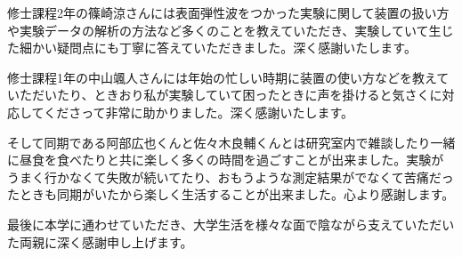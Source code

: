 \documentclass[dvipdfmx,11pt]{jsreport}
\numberwithin{equation}{chapter}
\numberwithin{table}{chapter}
\begin{document}
修士課程2年の篠崎涼さんには表面弾性波をつかった実験に関して装置の扱い方や実験データの解析の方法など多くのことを教えていただき、実験していて生じた細かい疑問点にも丁寧に答えていただきました。深く感謝いたします。

修士課程1年の中山颯人さんには年始の忙しい時期に装置の使い方などを教えていただいたり、ときおり私が実験していて困ったときに声を掛けると気さくに対応してくださって非常に助かりました。深く感謝いたします。

そして同期である阿部広也くんと佐々木良輔くんとは研究室内で雑談したり一緒に昼食を食べたりと共に楽しく多くの時間を過ごすことが出来ました。実験がうまく行かなくて失敗が続いてたり、おもうような測定結果がでなくて苦痛だったときも同期がいたから楽しく生活することが出来ました。心より感謝します。

最後に本学に通わせていただき、大学生活を様々な面で陰ながら支えていただいた両親に深く感謝申し上げます。
\end{document}
